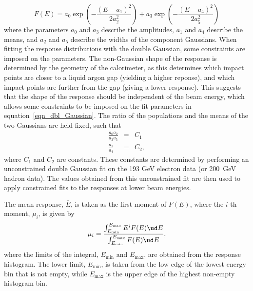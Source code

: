 \begin{equation}
F(E) = a_0 \exp \left( - \frac{(E - a_1)^2}{2 a_2^2} \right ) +  a_3 \exp \left( - \frac{(E - a_4)^2}{2 a_5^2} \right)
\label{eqn_dbl_Gaussian}
\end{equation}
where the parameters $a_0$ and $a_3$ describe the amplitudes, $a_1$ and $a_4$ describe the means, and $a_2$ and $a_5$ describe the widths of the component Gaussians. 
When fitting the response distributions with the double Gaussian, some constraints are imposed on the parameters. The non-Gaussian shape of the response is determined by the geometry of the calorimeter, as this determines which impact points are closer to a liquid argon gap (yielding a higher reponse), and which impact points are further from the gap (giving a lower response). This suggests that the shape of the response should be independent of the beam energy, which allows some constraints to be imposed on the fit parameters in equation~\ref{eqn_dbl_Gaussian}. The ratio of the populations and the means of the two Gaussians are held fixed, such that
\begin{eqnarray}
\frac{a_0 a_2}{a_3 a_5} & = & C_1 \label{eqn_constraint_1}\\
\frac{a_1}{a_4} & = & C_2,
\label{eqn_constraint_2}
\end{eqnarray}
where $C_1$ and $C_2$ are constants. These constants are determined by performing an unconstrained double Gaussian fit on the 193 GeV electron data (or 200~GeV hadron data). The values obtained from this unconstrained fit are then used to apply constrained fits to the responses at lower beam energies.
%
%
%
%
%
%
%
%
%

The mean response, $\overline{E}$, is taken as the first moment of $F(E)$, where the $i$-th moment, $\mu_i$, is given by
\begin{equation}
\label{eqn_moment}
\mu_i = \frac{\int^{E_{\mathrm{max}}}_{E_{\mathrm{min}}}  E^{i} F(E) \ud E }{\int^{E_{\mathrm{max}}}_{E_{\mathrm{min}}}  F(E) \ud E},
\end{equation}
where the limits of the integral, $E_\mathrm{min}$ and $E_\mathrm{max}$, are obtained from the response histogram. The lower limit, $E_\mathrm{min}$, is taken from the low edge of the lowest energy bin that is not empty, while $E_\mathrm{max}$ is the upper edge of the highest non-empty histogram bin. 

